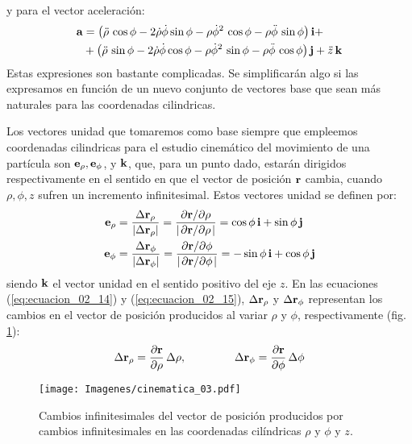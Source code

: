 y para el vector aceleración:
\begin{align}
\begin{aligned}
\vb{a} &= \left( \ddot{\rho} \, \cos \phi - 2 \dot{\rho} \dot{\phi} \sin \phi - \rho \dot{\phi}^{2} \, \cos \phi - \rho \ddot{\phi} \, \sin \phi \right) \vb{i} + \\
&+ \left( \ddot{\rho} \, \sin \phi - 2 \dot{\rho} \dot{\phi} \cos \phi - \rho \dot{\phi}^{2} \, \sin \phi - \rho \ddot{\phi} \, \cos \phi \right) \vb{j} + \ddot{z} \, \vb{k}
\end{aligned}
\label{eq:ecuacion_02_13}
\end{align}
Estas expresiones son bastante complicadas. Se simplificarán algo si las expresamos en función de un nuevo conjunto de vectores base que sean más naturales para las coordenadas cilindricas. 
\par
Los vectores unidad que tomaremos como base siempre que empleemos coordenadas cilindricas para el estudio cinemático del movimiento de una partícula son $\vb{e}_{\rho}, \vb{e}_{\phi}$, y $\vb{k}$, que, para un punto dado, estarán dirigidos respectivamente en el sentido en que el vector de posición $\vb{r}$ cambia, cuando $\rho, \phi, z$ sufren un incremento infinitesimal. Estos vectores unidad se definen por:
\begin{align}
\vb{e}_{\rho} &= \dfrac{\Delta \vb{r}_{\rho}}{\abs{\Delta \vb{r}_{\rho}}} = \dfrac{\pdv*{\vb{r}}{\rho}}{\abs{\pdv*{\vb{r}}{\rho}}} = \cos \phi \, \vb{i} + \sin \phi \, \vb{j} \label{eq:ecuacion_02_14} \\
\vb{e}_{\phi} &= \dfrac{\Delta \vb{r}_{\phi}}{\abs{\Delta \vb{r}_{\phi}}} = \dfrac{\pdv*{\vb{r}}{\phi}}{\abs{\pdv*{\vb{r}}{\phi}}} = - \sin \phi \, \vb{i} + \cos \phi \, \vb{j} \label{eq:ecuacion_02_15}
\end{align}
siendo $\vb{k}$ el vector unidad en el sentido positivo del eje $z$. En las ecuaciones (\ref{eq:ecuacion_02_14}) y (\ref{eq:ecuacion_02_15}), $\Delta \vb{r}_{\rho}$ y $\Delta \vb{r}_{\phi}$ representan los cambios en el vector de posición producidos al variar $\rho$ y $\phi$, respectivamente (fig. \ref{fig:figura_02_03}):
\begin{align*}
\Delta \vb{r}_{\rho} = \pdv{\vb{r}}{\rho} \, \Delta \rho, \hspace{1.5cm} \Delta \vb{r}_{\phi} = \pdv{\vb{r}}{\phi} \, \Delta \phi
\end{align*}
\begin{figure}[H]
    \centering
    \texttt{[image: Imagenes/cinematica\_03.pdf]}
    \caption{Cambios infinitesimales del vector de posición producidos por cambios infinitesimales en las coordenadas cilíndricas $\rho$ y $\phi$ y $z$.}
    \label{fig:figura_02_03}
\end{figure}
